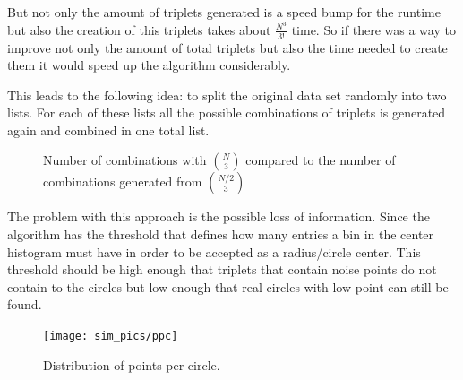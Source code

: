 \documentclass[11pt,twoside]{scrreprt}
\begin{document}
But not only the amount of triplets generated is a speed bump for the runtime but also the creation of this triplets takes about $\frac{N^3}{3!}$ time. So if there was a way to improve not only the amount of total triplets but also the time needed
to create them it would speed up the algorithm considerably.

This leads to the following idea: to split the original data set randomly into two lists. For each of these lists all the possible combinations of triplets is generated again and combined in one total list.

\begin{figure}[b]
\centering
  \caption{Number of combinations with $\binom{N}{3}$ compared to the number of combinations generated from $\binom{N/2}{3}$}
  \label{fig:binom_half_growth}
\end{figure}

The problem with this approach is the possible loss of information. Since the
algorithm has the threshold that defines how many entries a bin in the 
center histogram must have in order to be accepted as a radius/circle center.
This threshold should be high enough that triplets that contain noise points
do not contain to the circles but low enough that real circles with low point
can still be found.
\begin{figure}[tb]
   \centering
   \texttt{[image: sim\_pics/ppc]}
   \caption{Distribution of points per circle. }
   \label{fig:ppc}
 \end{figure} 
\end{document}
